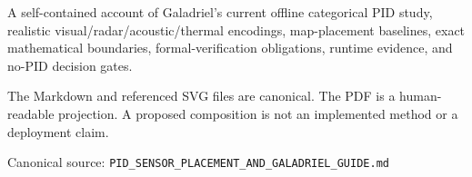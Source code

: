 {\begin{titlepage}
\begin{minipage}{0.86\textwidth}
      \large
      A self-contained account of Galadriel's current offline categorical PID study, realistic
      visual/radar/acoustic/thermal encodings, map-placement baselines, exact mathematical
      boundaries, formal-verification obligations, runtime evidence, and no-PID decision gates.
    \end{minipage}\par
    \vfill
    \begin{minipage}{0.88\textwidth}
      \small\color{PidSlate}
      The Markdown and referenced SVG files are canonical. The PDF is a human-readable projection.
      A proposed composition is not an implemented method or a deployment claim.
    \end{minipage}\par
    \vspace{12mm}
    {\large\color{PidInk}\@author\par}
    \vspace{3mm}
    {\large\color{PidInk}\@date\par}
    \vspace{3mm}
    {\small\color{PidSlate}Canonical source: \texttt{PID\_SENSOR\_PLACEMENT\_AND\_GALADRIEL\_GUIDE.md}\par}
    \vspace{17mm}
  \end{titlepage}
  \hypersetup{pageanchor=true}%
  \setcounter{page}{1}%
  \pagecolor{PidIvory}\color{PidInk}
}
\makeatother
